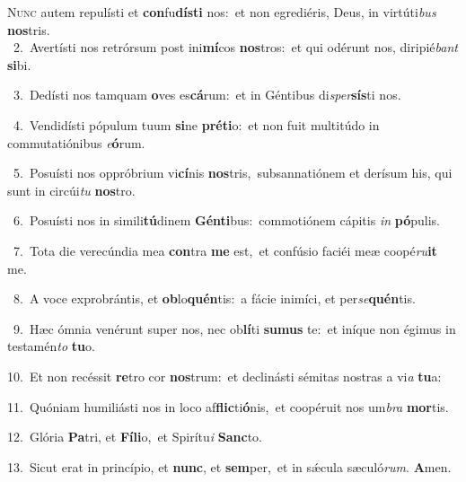 \lettrine{\initial\textcolor{\initialcolor}{N}}{unc} autem repulísti et \textbf{con}\-fu\-\textbf{dís}\-\textbf{ti} nos:~\star et non egrediéris, Deus, in virtúti\textit{bus} \textbf{nos}\-tris.\\
{\numbfont\textcolor{\numbcolor}{~2.}}~Avertísti nos retrórsum post ini\-\textbf{mí}\-cos \textbf{nos}\-tros:~\star et qui odérunt nos, diripié\textit{bant} \textbf{si}\-bi.\par
{\numbfont\textcolor{\numbcolor}{~3.}}~Dedísti nos tamquam \textbf{o}\-ves es\-\textbf{cá}\-rum:~\star et in Géntibus di\-\textit{sper}\-\textbf{sís}ti nos.\par
{\numbfont\textcolor{\numbcolor}{~4.}}~Vendidísti pópulum tuum \textbf{si}\-ne \textbf{pré}\-\textbf{ti}o:~\star et non fuit multitúdo in commutatiónibus \textit{e}\-\textbf{ó}rum.\par
{\numbfont\textcolor{\numbcolor}{~5.}}~Posuísti nos oppróbrium vi\-\textbf{cí}\-nis \textbf{nos}\-tris,~\star subsannatiónem et derísum his, qui sunt in circúi\textit{tu} \textbf{nos}\-tro.\par
{\numbfont\textcolor{\numbcolor}{~6.}}~Posuísti nos in simili\-\textbf{tú}\-dinem \textbf{Gén}\-\textbf{ti}bus:~\star commotiónem cápitis \textit{in} \textbf{pó}\-pulis.\par
{\numbfont\textcolor{\numbcolor}{~7.}}~Tota die verecúndia mea \textbf{con}\-tra \textbf{me} est,~\star et confúsio faciéi meæ coopé\-\textit{ru}\-\textbf{it} me.\par
{\numbfont\textcolor{\numbcolor}{~8.}}~A voce exprobrántis, et \textbf{ob}\-lo\-\textbf{quén}\-tis:~\star a fácie inimíci, et per\-\textit{se}\-\textbf{quén}tis.\par
{\numbfont\textcolor{\numbcolor}{~9.}}~Hæc ómnia venérunt super nos, nec ob\-\textbf{lí}\-ti \textbf{su}\-\textbf{mus} te:~\star et iníque non égimus in testamén\textit{to} \textbf{tu}\-o.\par
{\numbfont\textcolor{\numbcolor}{10.}}~Et non recéssit \textbf{re}\-tro cor \textbf{nos}\-trum:~\star et declinásti sémitas nostras a vi\textit{a} \textbf{tu}\-a:\par
{\numbfont\textcolor{\numbcolor}{11.}}~Quóniam humiliásti nos in loco af\-\textbf{flic}\-ti\-\textbf{ó}\-nis,~\star et coopéruit nos um\textit{bra} \textbf{mor}\-tis.\par
{\numbfont\textcolor{\numbcolor}{12.}}~Glória \textbf{Pa}\-tri, et \textbf{Fí}\-\textbf{li}o,~\star et Spirítu\textit{i} \textbf{Sanc}\-to.\par
{\numbfont\textcolor{\numbcolor}{13.}}~Sicut erat in princípio, et \textbf{nunc}\-, et \textbf{sem}\-per,~\star et in sǽcula sæculó\-\textit{rum}\-. \textbf{A}\-men.\par
